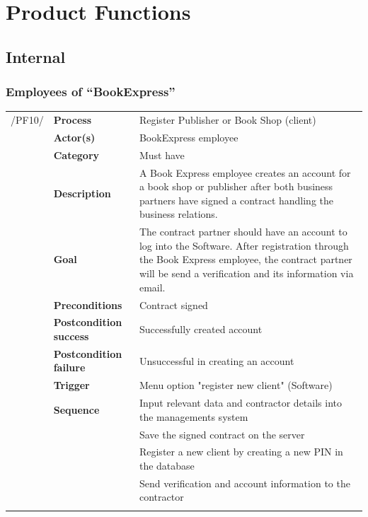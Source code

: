 \documentclass[11pt,a4paper,oneside,svgnames]{report}
\begin{document}
\chapter{Product Functions}

\section{Internal}
\subsection{Employees of ``BookExpress''}

\noindent
\begin{tabular}{p{1.5cm}p{3cm}p{8cm}}
/PF10/	& \textbf{Process}	& Register Publisher or Book Shop (client)\\
		& \textbf{Actor(s)} & BookExpress employee\\
		& \textbf{Category} & Must have\\
		& \textbf{Description}	 & A Book Express employee creates an account for a book shop or publisher after both business partners have signed a contract handling the business relations.\\
		& \textbf{Goal} & The contract partner should have an account to log into the Software. After registration through the Book Express employee, the contract partner will be send a verification and its 
		 information via email.\\
		& \textbf{Preconditions} & Contract signed\\
		& \textbf{Postcondition success} & Successfully created account\\
		& \textbf{Postcondition failure} & Unsuccessful in creating an account\\
		& \textbf{Trigger} & Menu option "register new client" (Software)\\
		& \textbf{Sequence} & Input relevant data and contractor details into the managements system\\
		& & Save the signed contract on the server\\
		& & Register a new client by creating a new PIN in the database\\
		& & Send verification and account information to the contractor\\
\hfill \\
\end{tabular}
\end{document}
